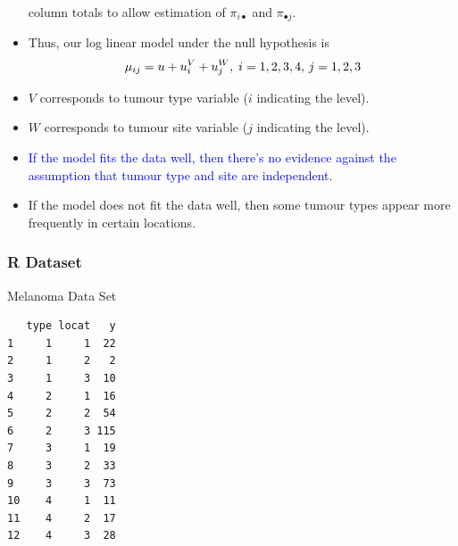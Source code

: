 \documentclass[oneside]{book}\usepackage[]{graphicx}\usepackage[svgnames]{xcolor}
\makeatletter
\newenvironment{kframe}{%
 \def\at@end@of@kframe{}%
 \ifinner\ifhmode%
  \def\at@end@of@kframe{\end{minipage}}%
  \begin{minipage}{\columnwidth}%
 \fi\fi%
 \def\FrameCommand##1{\hskip\@totalleftmargin \hskip-\fboxsep
 \colorbox{shadecolor}{##1}\hskip-\fboxsep
     \hskip-\linewidth \hskip-\@totalleftmargin \hskip\columnwidth}%
 \MakeFramed {\advance\hsize-\width
   \@totalleftmargin\z@ \linewidth\hsize
   \@setminipage}}%
 {\par\unskip\endMakeFramed%
 \at@end@of@kframe}
\newenvironment{knitrout}{}{} %
\let\log\relax%
\makeatother
\begin{document}
\begin{itemize}
            column totals to allow estimation of $ \pi_{i\bullet} $ and $ \pi_{\bullet j} $.
      \item Thus, our log linear model under the null hypothesis is
            \[ \log{\mu_{ij}}=u+u_i^V+u_j^W,\; i=1,2,3,4,\,j=1,2,3 \]
      \item $V$ corresponds to tumour type variable ($i$ indicating the level).
      \item $W$ corresponds to tumour site variable ($j$ indicating the level).
      \item \textcolor{Blue}{If the model fits the data well, then there's no evidence against the assumption
                  that tumour type and site are independent}.
      \item If the model does not fit the data well, then some tumour types appear more
            frequently in certain locations.
\end{itemize}
\subsubsection*{R Dataset}
\begin{Example}{Melanoma Data Set}
\begin{knitrout}
\color{fgcolor}\begin{kframe}
\begin{verbatim}
   type locat   y
1     1     1  22
2     1     2   2
3     1     3  10
4     2     1  16
5     2     2  54
6     2     3 115
7     3     1  19
8     3     2  33
9     3     3  73
10    4     1  11
11    4     2  17
12    4     3  28
\end{verbatim}
\end{kframe}
\end{knitrout}
\end{Example}
\end{document}
